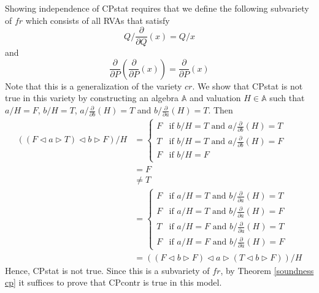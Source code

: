 \documentclass[a4paper,twoside,openright]{report}
\newcommand{\dd}[1]{\frac{\partial}{\partial #1}}
\newcommand{\lef}{\ensuremath{\triangleleft}}
\newcommand{\rig}{\ensuremath{\triangleright}}
\begin{document}
Showing independence of CPstat requires that we define the following subvariety of $fr$ which consists of all RVAs that satisfy
\[
Q/\dd Q(x)=Q/x
\]
and
\[
\dd P(\dd P(x)) = \dd P(x)
\]
Note that this is a generalization of the variety $cr$. We show that CPstat is not true in this variety by constructing an algebra $\mathbb{A}$ and valuation $H\in\mathbb{A}$ such that $a/H=F$, $b/H=T$, $a/\dd b(H)=T$ and $b/\dd a(H)=T$. Then
\begin{align*}
((F\lef a\rig T)\lef b\rig F)/H
&=\begin{cases}
F & \text{if $b/H=T$ and $a/\dd b(H)=T$}\\
T & \text{if $b/H=T$ and $a/\dd b(H)=F$}\\
F & \text{if $b/H=F$}
\end{cases}\\
&=F\\
&\ne T\\
&=\begin{cases}
F & \text{if $a/H=T$ and $b/\dd a(H)=T$}\\
F & \text{if $a/H=T$ and $b/\dd a(H)=F$}\\
T & \text{if $a/H=F$ and $b/\dd a(H)=T$}\\
F & \text{if $a/H=F$ and $b/\dd a(H)=F$}
\end{cases}\\
&=((F\lef b\rig F)\lef a\rig(T\lef b\rig F))/H
\end{align*}
Hence, CPstat is not true. Since this is a subvariety of $fr$, by Theorem \ref{soundness cp} it suffices to prove that CPcontr is true in this model.
\end{document}
